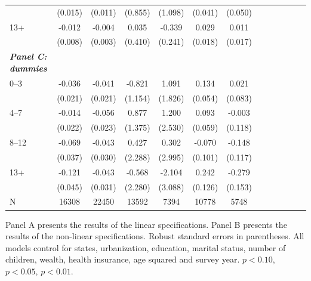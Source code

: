 \documentclass[12pt,english]{article}
\begin{document}
\begin{table}[!ht]
\begin{center}
\begin{adjustbox}{max width=\linewidth}
\begin{threeparttable}
{\begin{tabular}{l*{6}{S S}}
						&  (0.015)         &  (0.011)         &  (0.855)         &  (1.098)         &  (0.041)         &  (0.050)         \\
						13+   &    -0.012         &   -0.004         &    0.035         &   -0.339         &    0.029         &    0.011         \\
						&  (0.008)         &  (0.003)         &  (0.410)         &  (0.241)         &  (0.018)         &  (0.017)         \\
						\textit{\textbf{Panel C: dummies}} &&&&&&\\
						0--3&   -0.036\sym{*}  &   -0.041\sym{**} &   -0.821         &    1.091         &    0.134\sym{**} &    0.021         \\
						&  (0.021)         &  (0.021)         &  (1.154)         &  (1.826)         &  (0.054)         &  (0.083)         \\
						4--7&   -0.014         &   -0.056\sym{**} &    0.877         &    1.200         &    0.093         &   -0.003         \\
						&  (0.022)         &  (0.023)         &  (1.375)         &  (2.530)         &  (0.059)         &  (0.118)         \\
						8--12 &  -0.069\sym{*}  &   -0.043         &    0.427         &    0.302         &   -0.070         &   -0.148         \\
						&  (0.037)         &  (0.030)         &  (2.288)         &  (2.995)         &  (0.101)         &  (0.117)         \\
						13+ &   -0.121\sym{***}&   -0.043         &   -0.568         &   -2.104         &    0.242\sym{*}  &   -0.279\sym{*}  \\
						&  (0.045)         &  (0.031)         &  (2.280)         &  (3.088)         &  (0.126)         &  (0.153)         \\
						\midrule
						N         &    16308         &    22450         &    13592         &     7394         &    10778         &     5748         \\
						\bottomrule
					\end{tabular}
					\begin{tablenotes}
						\item \footnotesize  Panel A presents the results of the linear specifications. Panel B presents the results of the non-linear specifications. Robust standard errors in parentheses. All models control for  states, urbanization, education, marital status, number of children, wealth, health insurance, age squared and survey year. \sym{*} \(p<0.10\), \sym{**} \(p<0.05\), \sym{***} \(p<0.01\).
					\end{tablenotes}
				}
			\end{threeparttable}
		\end{adjustbox}
	\end{center}
\end{table}
\end{document}
